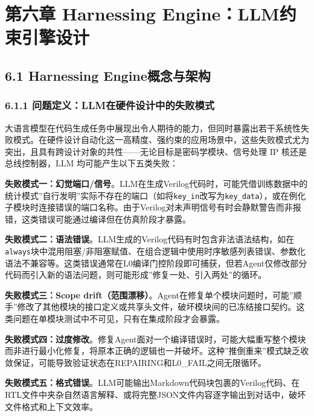 \section{第六章 Harnessing
Engine：LLM约束引擎设计}\label{ux7b2cux516dux7ae0-harnessing-enginellmux7ea6ux675fux5f15ux64ceux8bbeux8ba1}

\subsection{6.1 Harnessing
Engine概念与架构}\label{harnessing-engineux6982ux5ff5ux4e0eux67b6ux6784}

\subsubsection{6.1.1
问题定义：LLM在硬件设计中的失败模式}\label{ux95eeux9898ux5b9aux4e49llmux5728ux786cux4ef6ux8bbeux8ba1ux4e2dux7684ux5931ux8d25ux6a21ux5f0f}

大语言模型在代码生成任务中展现出令人期待的能力，但同时暴露出若干系统性失败模式。在硬件设计自动化这一高精度、强约束的应用场景中，这些失败模式尤为突出，且具有跨设计对象的共性------无论目标是密码学模块、信号处理
IP 核还是总线控制器，LLM 均可能产生以下五类失败：

\textbf{失败模式一：幻觉端口/信号}。LLM在生成Verilog代码时，可能凭借训练数据中的统计模式''自行发明''实际不存在的端口（如将\texttt{key\_in}改写为\texttt{key\_data}），或在例化子模块时连接错误的端口名称。由于Verilog对未声明信号有时会静默警告而非报错，这类错误可能通过编译但在仿真阶段才暴露。

\textbf{失败模式二：语法错误}。LLM生成的Verilog代码有时包含非法语法结构，如在\texttt{always}块中混用阻塞/非阻塞赋值、在组合逻辑中使用时序敏感列表错误、参数化语法不兼容等。这类错误通常在L0编译门控阶段即可捕获，但若Agent仅修改部分代码而引入新的语法问题，则可能形成''修复一处、引入两处''的循环。

\textbf{失败模式三：Scope
drift（范围漂移）}。Agent在修复单个模块问题时，可能''顺手''修改了其他模块的接口定义或共享头文件，破坏模块间的已冻结接口契约。这类问题在单模块测试中不可见，只有在集成阶段才会暴露。

\textbf{失败模式四：过度修改}。修复Agent面对一个编译错误时，可能大幅重写整个模块而非进行最小化修复，将原本正确的逻辑也一并破坏。这种''推倒重来''模式缺乏收敛保证，可能导致验证状态在REPAIRING和L0\_FAIL之间无限循环。

\textbf{失败模式五：格式错误}。LLM可能输出Markdown代码块包裹的Verilog代码、在RTL文件中夹杂自然语言解释、或将完整JSON文件内容逐字输出到对话中，破坏文件格式和上下文效率。

